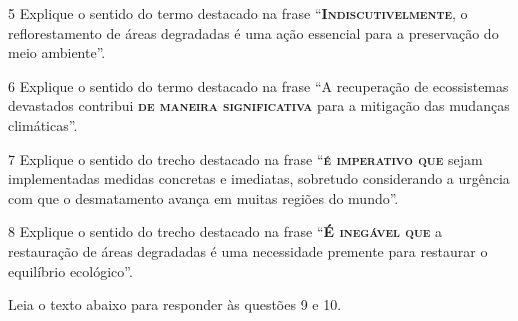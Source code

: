 \num{5} Explique o sentido do termo destacado na frase ``\textsc{\textbf{Indiscutivelmente}}, o
reflorestamento de áreas degradadas é uma ação essencial para a preservação do
meio ambiente''.


\num{6} Explique o sentido do termo destacado na frase ``A recuperação de
ecossistemas devastados contribui \textsc{\textbf{de maneira significativa}} para a mitigação das
mudanças climáticas''.


\num{7} Explique o sentido do trecho destacado na frase ``\textsc{\textbf{é imperativo que}} sejam 
implementadas medidas concretas e imediatas, sobretudo considerando a urgência com que o
desmatamento avança em muitas regiões do mundo''.


\num{8} Explique o sentido do trecho destacado na frase ``\textsc{\textbf{É
inegável que}} a restauração de áreas degradadas é uma necessidade premente
para restaurar o equilíbrio ecológico''.


Leia o texto abaixo para responder às questões 9 e 10.

